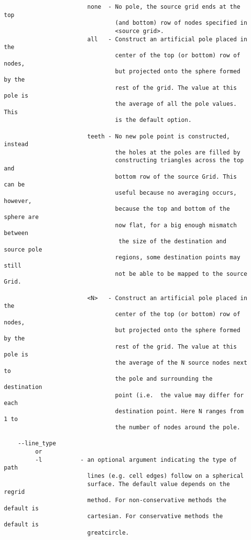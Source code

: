 \begin{verbatim}
                        none  - No pole, the source grid ends at the top
                                (and bottom) row of nodes specified in
                                <source grid>.
                        all   - Construct an artificial pole placed in the
                                center of the top (or bottom) row of nodes,
                                but projected onto the sphere formed by the
                                rest of the grid. The value at this pole is
                                the average of all the pole values. This
                                is the default option.

                        teeth - No new pole point is constructed, instead
                                the holes at the poles are filled by
                                constructing triangles across the top and
                                bottom row of the source Grid. This can be
                                useful because no averaging occurs, however,
                                because the top and bottom of the sphere are
                                now flat, for a big enough mismatch between
                                 the size of the destination and source pole
                                regions, some destination points may still
                                not be able to be mapped to the source Grid.

                        <N>   - Construct an artificial pole placed in the
                                center of the top (or bottom) row of nodes,
                                but projected onto the sphere formed by the
                                rest of the grid. The value at this pole is
                                the average of the N source nodes next to
                                the pole and surrounding the destination
                                point (i.e.  the value may differ for each
                                destination point. Here N ranges from 1 to
                                the number of nodes around the pole.

    --line_type 
         or
         -l           - an optional argument indicating the type of path
                        lines (e.g. cell edges) follow on a spherical
                        surface. The default value depends on the regrid
                        method. For non-conservative methods the default is
                        cartesian. For conservative methods the default is
                        greatcircle. 


\end{verbatim}
